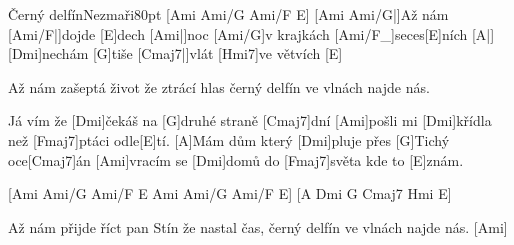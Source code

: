 \begin{song}{Černý delfín}{Nezmaři}{80pt}
[Ami Ami/G Ami/F E]{}
%
[Ami Ami/G|]{Až nám} [Ami/F|]{dojde} [E]dech [Ami|]{noc} [Ami/G]v krajkách [Ami/F_]{seces}[E]ních
[A|]{} [Dmi]nechám [G]tiše [Cmaj7|]{vlát} [Hmi7]ve větvích [E]{}

%
Až nám zašeptá život že ztrácí hlas 
černý delfín ve vlnách najde nás. 

\chorus%
[A]Já vím že [Dmi]{če}káš na [G]druhé straně [Cmaj7]dní 
[Ami]pošli mi [Dmi]křídla než [Fmaj7]ptáci odle[E]tí. 
[A]Mám dům který [Dmi]pluje přes [G]Tichý oce[Cmaj7]{án} 
[Ami]vracím se [Dmi]domů do [Fmaj7]světa kde to [E]znám. 

\verse{*}[Ami Ami/G Ami/F E Ami Ami/G Ami/F  E]{} 
[A Dmi G Cmaj7 Hmi  E]{}
\repchor

%
Až nám přijde říct pan Stín že nastal čas, 
černý delfín ve vlnách najde nás.
[Ami]{}
\end{song}
